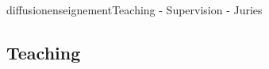 \documentclass{ra2016}
\begin{document}
\begin{module}{diffusion}{enseignement}{Teaching - Supervision - Juries}

\subsection {Teaching}


%



\end{module}
\end{document}
